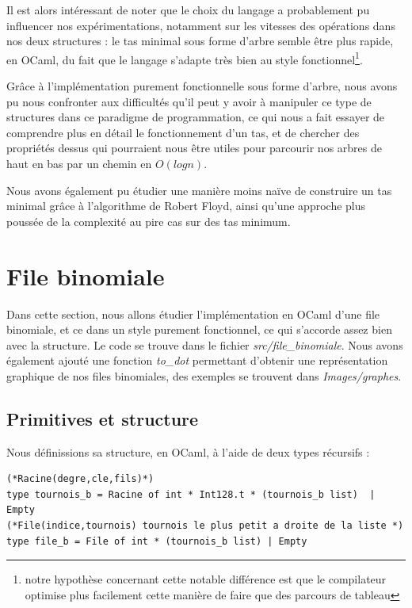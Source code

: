 \documentclass[12pt,a4paper]{article}
\begin{document}
Il est alors intéressant de noter que le choix du langage a probablement pu influencer nos expérimentations, notamment sur les vitesses des opérations dans nos deux structures : le tas minimal sous forme d'arbre semble être plus rapide, en OCaml, du fait que le langage s'adapte très bien au style fonctionnel\footnote{notre hypothèse concernant cette notable différence est que le compilateur optimise plus facilement cette manière de faire que des parcours de tableau}.

Grâce à l'implémentation purement fonctionnelle sous forme d'arbre, nous avons pu nous confronter aux difficultés qu'il peut y avoir à manipuler ce type de structures dans ce paradigme de programmation, ce qui nous a fait essayer de comprendre plus en détail le fonctionnement d'un tas, et de chercher des propriétés dessus qui pourraient nous être utiles pour parcourir nos arbres de haut en bas par un chemin en $O(log n)$.

Nous avons également pu étudier une manière moins naïve de construire un tas minimal grâce à l'algorithme de Robert Floyd\cite{ACM}, ainsi qu'une approche plus poussée de la complexité au pire cas sur des tas minimum.

\newpage
 \section{File binomiale}

Dans cette section, nous allons étudier l'implémentation en OCaml d'une file binomiale\cite{TasBinom}, et ce dans un style purement fonctionnel, ce qui s'accorde assez bien avec la structure.
Le code se trouve dans le fichier \textit{src/file\_binomiale}. Nous avons également ajouté une fonction \textit{to\_dot} permettant d'obtenir une représentation graphique de nos files binomiales, des exemples se trouvent dans \textit{Images/graphes}.

\subsection{Primitives et structure}

Nous définissions sa structure, en OCaml, à l'aide de deux types récursifs : 

\bigskip \begin{lstlisting}
(*Racine(degre,cle,fils)*)
type tournois_b = Racine of int * Int128.t * (tournois_b list)  | Empty 
(*File(indice,tournois) tournois le plus petit a droite de la liste *) 
type file_b = File of int * (tournois_b list) | Empty 
\end{lstlisting} \bigskip
\end{document}
